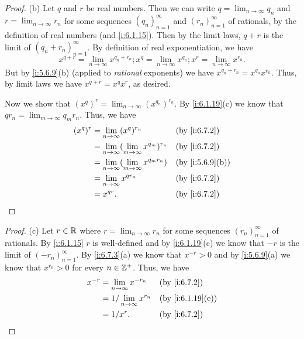\begin{proof}{(b)}
  Let \(q\) and \(r\) be real numbers.
  Then we can write \(q = \lim_{n \to \infty} q_n\) and \(r = \lim_{n \to \infty} r_n\) for some sequences \((q_n)_{n = 1}^\infty\) and \((r_n)_{n = 1}^\infty\) of rationals, by the definition of real numbers (and \cref{i:6.1.15}).
  Then by the limit laws, \(q + r\) is the limit of \((q_n + r_n)_{n = 1}^\infty\).
  By definition of real exponentiation, we have
  \[
    x^{q + r} = \lim_{n \to \infty} x^{q_n + r_n} ; x^q = \lim_{n \to \infty} x^{q_n} ;  x^r = \lim_{n \to \infty} x^{r_n}.
  \]
  But by \cref{i:5.6.9}(b) (applied to \emph{rational} exponents) we have \(x^{q_n + r_n} = x^{q_n} x^{r_n}\).
  Thus, by limit laws we have \(x^{q + r} = x^q x^r\), as desired.

  Now we show that \((x^q)^r = \lim_{n \to \infty} (x^{q_n})^{r_n}\).
  By \cref{i:6.1.19}(c) we know that \(q r_n = \lim_{m \to \infty} q_m r_n\).
  Thus, we have
  \begin{align*}
    (x^q)^r & = \lim_{n \to \infty} (x^q)^{r_n}                         &  & \by{i:6.7.2}    \\
            & = \lim_{n \to \infty} (\lim_{m \to \infty} x^{q_m})^{r_n} &  & \by{i:6.7.2}    \\
            & = \lim_{n \to \infty} (\lim_{m \to \infty} x^{q_m r_n})   &  & \by{i:5.6.9}[b] \\
            & = \lim_{n \to \infty} x^{q r_n}                           &  & \by{i:6.7.2}    \\
            & = x^{qr}.                                                 &  & \by{i:6.7.2}
  \end{align*}
\end{proof}

\begin{proof}{(c)}
  Let \(r \in \mathbb{R}\) where \(r = \lim_{n \to \infty} r_n\) for some sequences \((r_n)_{n = 1}^\infty\) of rationals.
  By \cref{i:6.1.15} \(r\) is well-defined and by \cref{i:6.1.19}(c) we know that \(-r\) is the limit of \((-r_n)_{n = 1}^\infty\).
  By \cref{i:6.7.3}(a) we know that \(x^{-r} > 0\) and by \cref{i:5.6.9}(a) we know that \(x^{r_n} > 0\) for every \(n \in \mathbb{Z}^+\).
  Thus, we have
  \begin{align*}
    x^{-r} & = \lim_{n \to \infty} x^{-r_n}    &  & \by{i:6.7.2}     \\
           & = 1 / \lim_{n \to \infty} x^{r_n} &  & \by{i:6.1.19}[e] \\
           & = 1 / x^r.                        &  & \by{i:6.7.2}
  \end{align*}
\end{proof}

